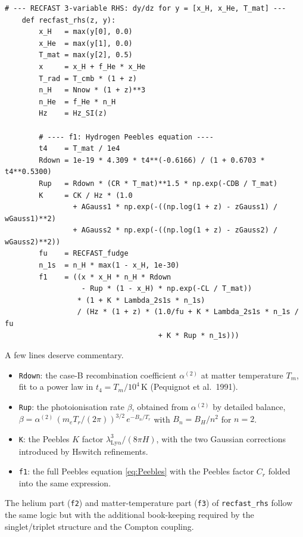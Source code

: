 \begin{codebox}
\begin{lstlisting}[style=python]
    # --- RECFAST 3-variable RHS: dy/dz for y = [x_H, x_He, T_mat] ---
    def recfast_rhs(z, y):
        x_H   = max(y[0], 0.0)
        x_He  = max(y[1], 0.0)
        T_mat = max(y[2], 0.5)
        x     = x_H + f_He * x_He
        T_rad = T_cmb * (1 + z)
        n_H   = Nnow * (1 + z)**3
        n_He  = f_He * n_H
        Hz    = Hz_SI(z)

        # ---- f1: Hydrogen Peebles equation ----
        t4    = T_mat / 1e4
        Rdown = 1e-19 * 4.309 * t4**(-0.6166) / (1 + 0.6703 * t4**0.5300)
        Rup   = Rdown * (CR * T_mat)**1.5 * np.exp(-CDB / T_mat)
        K     = CK / Hz * (1.0
                + AGauss1 * np.exp(-((np.log(1 + z) - zGauss1) / wGauss1)**2)
                + AGauss2 * np.exp(-((np.log(1 + z) - zGauss2) / wGauss2)**2))
        fu    = RECFAST_fudge
        n_1s  = n_H * max(1 - x_H, 1e-30)
        f1    = ((x * x_H * n_H * Rdown
                  - Rup * (1 - x_H) * np.exp(-CL / T_mat))
                 * (1 + K * Lambda_2s1s * n_1s)
                 / (Hz * (1 + z) * (1.0/fu + K * Lambda_2s1s * n_1s / fu
                                    + K * Rup * n_1s)))
\end{lstlisting}
\end{codebox}

\noindent A few lines deserve commentary.

\begin{itemize}
  \item \texttt{Rdown}: the case-B recombination coefficient $\alpha^{(2)}$ at matter temperature $T_m$, fit to a power law in $t_4 = T_m/10^4\,\mathrm{K}$ (Pequignot et al.\ 1991).
  \item \texttt{Rup}: the photoionisation rate $\beta$, obtained from $\alpha^{(2)}$ by detailed balance, $\beta = \alpha^{(2)}\, (m_e T_r/(2\pi))^{3/2}\, e^{-B_n/T_r}$ with $B_n = B_H/n^2$ for $n = 2$.
  \item \texttt{K}: the Peebles $K$ factor $\lambda_\mathrm{Ly\alpha}^3/(8\pi H)$, with the two Gaussian corrections introduced by Hswitch refinements.
  \item \texttt{f1}: the full Peebles equation \cref{eq:Peebles} with the Peebles factor $C_r$ folded into the same expression.
\end{itemize}

The helium part (\texttt{f2}) and matter-temperature part (\texttt{f3}) of \texttt{recfast\_rhs} follow the same logic but with the additional book-keeping required by the singlet/triplet structure and the Compton coupling.

